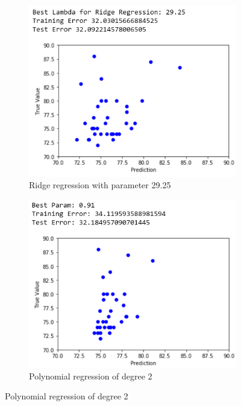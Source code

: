 \documentclass{article}
\begin{document}
\begin{figure}[h]
\begin{subfigure}{0.5\textwidth}
\includegraphics[width=0.9\linewidth]{ridgewithtuning.png} 
\caption{Ridge regression with parameter 29.25}
\end{subfigure}
\begin{subfigure}{0.5\textwidth}
\includegraphics[width=0.9\linewidth]{polyregwithtuning.png}
\caption{Polynomial regression of degree 2}
\end{subfigure}
\end{figure}\\
\end{document}

